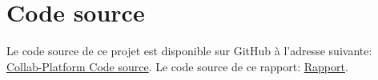 \documentclass{article}
\begin{document}
    \section{Code source}
        Le code source de ce projet est disponible sur GitHub à l'adresse suivante: \href{https://github.com/MedHK008/collaboration-Platform}{Collab-Platform Code source}.
        Le code source de ce rapport: \href{https://github.com/MedHK008/Rapport}{Rapport}.
\end{document}
